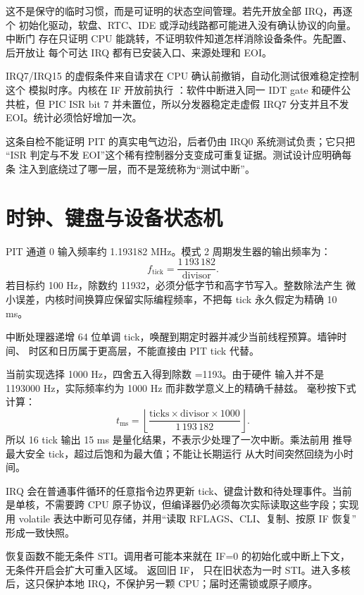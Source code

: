 这不是保守的临时习惯，而是可证明的状态空间管理。若先开放全部 IRQ，再逐个
初始化驱动，软盘、RTC、IDE 或浮动线路都可能进入没有确认协议的向量。中断门
存在只证明 CPU 能跳转，不证明软件知道怎样消除设备条件。先配置、后开放让
每个可达 IRQ 都有已安装入口、来源处理和 EOI。

IRQ7/IRQ15 的虚假条件来自请求在 CPU 确认前撤销，自动化测试很难稳定控制这个
模拟时序。内核在 IF 开放前执行 ：软件中断进入同一 IDT
gate 和硬件公共桩，但 PIC ISR bit 7 并未置位，所以分发器稳定走虚假 IRQ7
分支并且不发 EOI。统计必须恰好增加一次。

这条自检不能证明 PIT 的真实电气边沿，后者仍由 IRQ0 系统测试负责；它只把
“ISR 判定与不发 EOI”这个稀有控制器分支变成可重复证据。测试设计应明确每条
注入到底绕过了哪一层，而不是笼统称为“测试中断”。

\section{时钟、键盘与设备状态机}

PIT 通道 0 输入频率约 1.193182 MHz。模式 2 周期发生器的输出频率为：
\[
  f_{\mathrm{tick}}=\frac{1\,193\,182}{\mathrm{divisor}}.
\]
若目标约 100 Hz，除数约 11932，必须分低字节和高字节写入。整数除法产生
微小误差，内核时间换算应保留实际编程频率，不把每 tick 永久假定为精确
10 ms。

中断处理器递增 64 位单调 tick，唤醒到期定时器并减少当前线程预算。墙钟时间、
时区和日历属于更高层，不能直接由 PIT tick 代替。

当前实现选择 1000 Hz，四舍五入得到除数 =1193。由于硬件
输入并不是 1193000 Hz，实际频率约为 1000 Hz 而非数学意义上的精确千赫兹。
毫秒按下式计算：
\[
  t_{\mathrm{ms}} =
  \left\lfloor
  \frac{\mathrm{ticks}\times \mathrm{divisor}\times1000}{1\,193\,182}
  \right\rfloor .
\]
所以 16 tick 输出 15 ms 是量化结果，不表示少处理了一次中断。乘法前用
 推导最大安全 tick，超过后饱和为最大值；不能让长期运行
从大时间突然回绕为小时间。

IRQ 会在普通事件循环的任意指令边界更新 tick、键盘计数和待处理事件。当前
是单核，不需要跨 CPU 原子协议，但编译器仍必须每次实际读取这些字段；实现用
volatile 表达中断可见存储，并用“读取 RFLAGS、CLI、复制、按原 IF 恢复”
形成一致快照。

恢复函数不能无条件 STI。调用者可能本来就在 IF=0 的初始化或中断上下文，
无条件开启会扩大可重入区域。 返回旧 IF，
 只在旧状态为一时 STI。进入多核后，这只保护本地
IRQ，不保护另一颗 CPU；届时还需锁或原子顺序。


